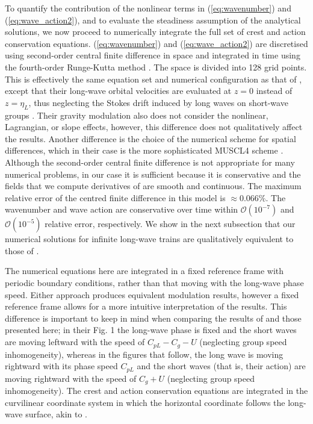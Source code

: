 \documentclass[lineno]{jfm}
\begin{document}
To quantify the contribution of the nonlinear terms in (\ref{eq:wavenumber})
and (\ref{eq:wave_action2}), and to evaluate the steadiness assumption of the
analytical solutions, we now proceed to numerically integrate the full set of
crest and action conservation equations.
(\ref{eq:wavenumber}) and (\ref{eq:wave_action2}) are discretised using
second-order central finite difference in space and integrated in time using the
fourth-order Runge-Kutta method \citep{butcher1996runge}.
The space is divided into 128 grid points.
This is effectively the same equation set and numerical configuration as that of
\citet{peureux2021unsteady}, except that their long-wave orbital velocities are
evaluated at $z=0$ instead of $z=\eta_L$, thus neglecting the Stokes drift
induced by long waves on short-wave groups
\citep{stokes1847,van2018stokes,monismith2020stokes}.
Their gravity modulation also does not consider the nonlinear, Lagrangian, or
slope effects, however, this difference does not qualitatively affect the results.
Another difference is the choice of the numerical scheme for spatial differences,
which in their case is the more sophisticated MUSCL4 scheme \citep{kurganov2000new}.
Although the second-order central finite difference is not appropriate for many
numerical problems, in our case it is sufficient because it is conservative and
the fields that we compute derivatives of are smooth and continuous.
The maximum relative error of the centred finite difference in this model
is $\approx 0.066\%$.
The wavenumber and wave action are conservative over time within
$\mathcal{O}(10^{-7})$ and $\mathcal{O}(10^{-5})$ relative error, respectively.
We show in the next subsection that our numerical solutions for infinite long-wave
trains are qualitatively equivalent to those of \citet{peureux2021unsteady}.

The numerical equations here are integrated in a fixed reference frame with
periodic boundary conditions, rather than that moving with the long-wave phase speed.
Either approach produces equivalent modulation results, however a fixed
reference frame allows for a more intuitive interpretation of the results.
This difference is important to keep in mind when comparing the results
of \citet{peureux2021unsteady} and those presented here; in their Fig. 1 the
long-wave phase is fixed and the short waves are moving leftward
with the speed of $C_{pL} - C_g - U$ (neglecting group speed inhomogeneity),
whereas in the figures that follow, the long wave is moving rightward with its
phase speed $C_{pL}$ and the short waves (that is, their action) are moving
rightward with the speed of $C_g + U$ (neglecting group speed inhomogeneity).
The crest and action conservation equations are integrated in the curvilinear
coordinate system in which the horizontal coordinate follows the long-wave
surface, akin to \citet{zhang1990evolution}.
\end{document}
